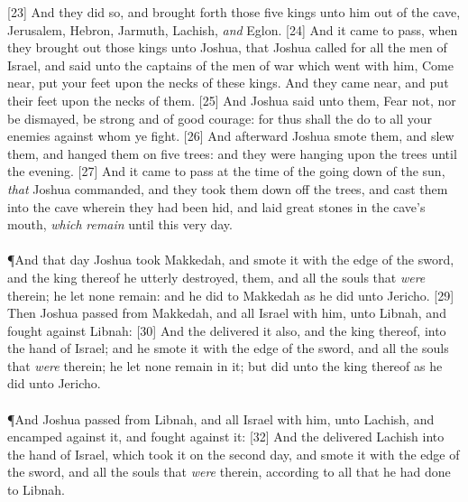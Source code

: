 [23] \textcolor[cmyk]{0.99998,1,0,0}{And they did so, and brought forth those five kings unto him out of the cave,  Jerusalem,  Hebron,  Jarmuth,  Lachish, \emph{and}  Eglon.}
[24] \textcolor[cmyk]{0.99998,1,0,0}{And it came to pass, when they brought out those kings unto Joshua, that Joshua called for all the men of Israel, and said unto the captains of the men of war which went with him, Come near, put your feet upon the necks of these kings. And they came near, and put their feet upon the necks of them.}
[25] \textcolor[cmyk]{0.99998,1,0,0}{And Joshua said unto them, Fear not, nor be dismayed, be strong and of good courage: for thus shall the  do to all your enemies against whom ye fight.}
[26] \textcolor[cmyk]{0.99998,1,0,0}{And afterward Joshua smote them, and slew them, and hanged them on five trees: and they were hanging upon the trees until the evening.}
[27] \textcolor[cmyk]{0.99998,1,0,0}{And it came to pass at the time of the going down of the sun, \emph{that} Joshua commanded, and they took them down off the trees, and cast them into the cave wherein they had been hid, and laid great stones in the cave's mouth, \emph{which} \emph{remain} until this very day.}\\
\\
\P \textcolor[cmyk]{0.99998,1,0,0}{And that day Joshua took Makkedah, and smote it with the edge of the sword, and the king thereof he utterly destroyed, them, and all the souls that \emph{were} therein; he let none remain: and he did to  Makkedah as he did unto  Jericho.}
[29] \textcolor[cmyk]{0.99998,1,0,0}{Then Joshua passed from Makkedah, and all Israel with him, unto Libnah, and fought against Libnah:}
[30] \textcolor[cmyk]{0.99998,1,0,0}{And the  delivered it also, and the king thereof, into the hand of Israel; and he smote it with the edge of the sword, and all the souls that \emph{were} therein; he let none remain in it; but did unto the king thereof as he did unto  Jericho.}\\
\\
\P \textcolor[cmyk]{0.99998,1,0,0}{And Joshua passed from Libnah, and all Israel with him, unto Lachish, and encamped against it, and fought against it:}
[32] \textcolor[cmyk]{0.99998,1,0,0}{And the  delivered Lachish into the hand of Israel, which took it on the second day, and smote it with the edge of the sword, and all the souls that \emph{were} therein, according to all that he had done to Libnah.}\\
